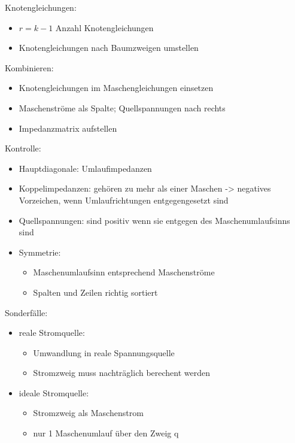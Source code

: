 \documentclass[
  ngerman,
  letterpaper,
]{scrbook}
\providecommand{\tightlist}{%
  \setlength{\itemsep}{0pt}\setlength{\parskip}{0pt}}
\begin{document}
Knotengleichungen:

\begin{itemize}
\tightlist
\item
  \(r = k - 1\) Anzahl Knotengleichungen
\item
  Knotengleichungen nach Baumzweigen umstellen
\end{itemize}

Kombinieren:

\begin{itemize}
\tightlist
\item
  Knotengleichungen im Maschengleichungen einsetzen
\item
  Maschenströme als Spalte; Quellspannungen nach rechts
\item
  Impedanzmatrix aufstellen
\end{itemize}

Kontrolle:

\begin{itemize}
\tightlist
\item
  Hauptdiagonale: Umlaufimpedanzen
\item
  Koppelimpedanzen: gehören zu mehr als einer Maschen -\textgreater{}
  negatives Vorzeichen, wenn Umlaufrichtungen entgegengesetzt sind
\item
  Quellspannungen: sind positiv wenn sie entgegen des Maschenumlaufsinns
  sind
\item
  Symmetrie:

  \begin{itemize}
  \tightlist
  \item
    Maschenumlaufsinn entsprechend Maschenströme
  \item
    Spalten und Zeilen richtig sortiert
  \end{itemize}
\end{itemize}

Sonderfälle:

\begin{itemize}
\tightlist
\item
  reale Stromquelle:

  \begin{itemize}
  \tightlist
  \item
    Umwandlung in reale Spannungsquelle
  \item
    Stromzweig muss nachträglich berechent werden
  \end{itemize}
\item
  ideale Stromquelle:

  \begin{itemize}
  \tightlist
  \item
    Stromzweig als Maschenstrom
  \item
    nur 1 Maschenumlauf über den Zweig q
  \end{itemize}
\end{itemize}
\end{document}
